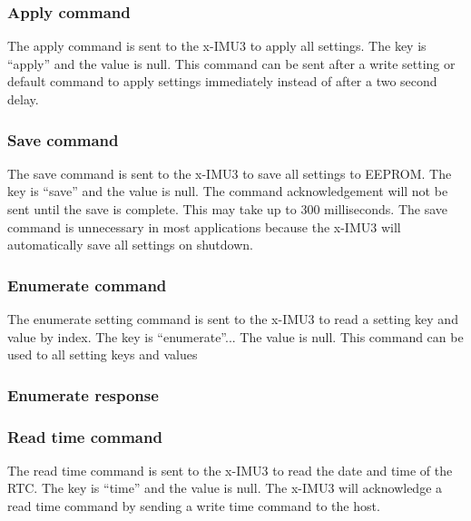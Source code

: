 \subsubsection{Apply command}

The apply command is sent to the x-IMU3 to apply all settings.  The key is \enquote{apply} and the value is null.  This command can be sent after a write setting or default command to apply settings immediately instead of after a two second delay.


\subsubsection{Save command}

The save command is sent to the x-IMU3 to save all settings to \ac{EEPROM}.  The key is \enquote{save} and the value is null.  The command acknowledgement will not be sent until the save is complete.  This may take up to 300 milliseconds.  The save command is unnecessary in most applications because the x-IMU3 will automatically save all settings on shutdown.


\subsubsection{Enumerate command}

The enumerate setting command is sent to the x-IMU3 to read a setting key and value by index.  The key is \enquote{enumerate}...
%
The value is null.
%
This command can be used to all setting keys and values


\subsubsection{Enumerate response}


\subsubsection{Read time command}

The read time command is sent to the x-IMU3 to read the date and time of the \ac{RTC}.  The key is \enquote{time} and the value is null.  The x-IMU3 will acknowledge a read time command by sending a write time command to the host.


